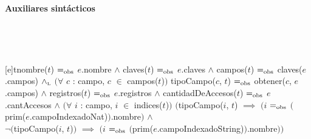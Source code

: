 \begin{Representacion}
\medskip

  \noindent\textbf{Auxiliares sintácticos}

  ~
	
  ~
 
  [e]{t}{nombre($t$) $=_{\mathrm{obs}}$ $e$.nombre $\land$ claves($t$) $=_{\mathrm{obs}}$ $e$.claves $\land$ campos($t$) $=_{\mathrm{obs}}$ claves($e$.campos) $\land_{\mathrm{\scriptscriptstyle{L}}}$ $\big(\forall$ $c$ : campo, $c$ $\in$ campos($t$)$\big)$ tipoCampo($c$, $t$) $=_{\mathrm{obs}}$ obtener($c$, $e$.campos) $\land$ registros($t$) $=_{\mathrm{obs}}$ $e$.registros $\land$ cantidadDeAccesos($t$) $=_{\mathrm{obs}}$ $e$.cantAccesos $\land$ $\big(\forall$ $i$ : campo, $i$ $\in$ indices($t$)$\big)$ $\Big($tipoCampo($i$, $t$) $\implies$ $\big(i$ $=_{\mathrm{obs}}$ $\big($prim($e$.campoIndexadoNat)$\big)$.nombre$\big)$ $\land$ \\
  $\neg\big($tipoCampo($i$, $t$)$\big)$ $\implies$ $\big(i$ $=_{\mathrm{obs}}$ $\big($prim($e$.campoIndexadoString)$\big)$.nombre$\big)\Big)$}

  ~

\end{Representacion}

\bigskip

